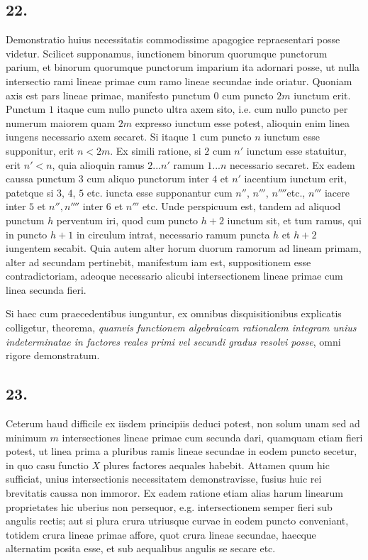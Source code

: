 \documentclass[twoside,12pt, showframe]{memoir}
\begin{document}
\subsection*{22.}
Demonstratio huius necessitatis commodissime apagogice repraesentari posse videtur. Scilicet supponamus, iunctionem binorum quorumque punctorum parium, et binorum quorumque punctorum imparium ita adornari posse, ut nulla intersectio rami lineae primae cum ramo lineae secundae inde oriatur. Quoniam axis est pars lineae primae, manifesto punctum \(0\) cum puncto \(2m\) iunctum erit. Punctum \(1\) itaque cum nullo puncto ultra axem sito, i.e. cum nullo puncto per numerum maiorem quam \(2m\) expresso iunctum esse potest, alioquin enim linea iungens necessario axem secaret. Si itaque \(1\) cum puncto \(n\) iunctum esse supponitur, erit \(n<2m\). Ex simili ratione, si \(2\) cum \(n'\) iunctum esse statuitur, erit \(n'<n\), quia alioquin ramus \(2...n'\) ramum \(1...n\) necessario secaret. Ex eadem caussa punctum \(3\) cum aliquo punctorum inter \(4\) et \(n'\) iacentium iunctum erit, patetque si \(3\), \(4\), \(5\) etc{.} iuncta esse supponantur cum \(n''\), \(n'''\), \(n''''\)etc{.}, \(n'''\) iacere inter \(5\) et \(n'', n''''\) inter \(6\) et \(n'''\) etc{.} Unde perspicuum est, tandem ad aliquod punctum \(h\) perventum iri, quod cum puncto \(h+2\) iunctum sit, et tum ramus, qui in puncto \(h+1\) in circulum intrat, necessario ramum puncta \(h\) et \(h+2\) iungentem secabit. Quia autem alter horum duorum ramorum ad lineam primam, alter ad secundam pertinebit, manifestum iam est, suppositionem esse contradictoriam, adeoque necessario alicubi intersectionem lineae primae cum linea secunda fieri.

Si haec cum praecedentibus iunguntur, ex omnibus disquisitionibus explicatis colligetur, theorema, \textit{quamvis functionem algebraicam rationalem integram unius indeterminatae in factores reales primi vel secundi gradus resolvi posse}, omni rigore demonstratum.


\subsection*{23.} 

Ceterum haud difficile ex iisdem principiis deduci potest, non solum unam sed ad minimum \(m\) intersectiones lineae primae cum secunda dari, quamquam etiam fieri potest, ut linea prima a pluribus ramis lineae secundae in eodem puncto secetur, in quo casu functio \(X\) plures factores aequales habebit. Attamen quum hic sufficiat, unius intersectionis necessitatem demonstravisse, fusius huic rei brevitatis caussa non immoror. Ex eadem ratione etiam alias harum linearum proprietates hic uberius non persequor, e.g. intersectionem semper fieri sub angulis rectis; aut si plura crura utriusque curvae in eodem puncto conveniant, totidem crura lineae primae affore, quot crura lineae secundae, haecque alternatim posita esse, et sub aequalibus angulis se secare etc{.}
\end{document}
